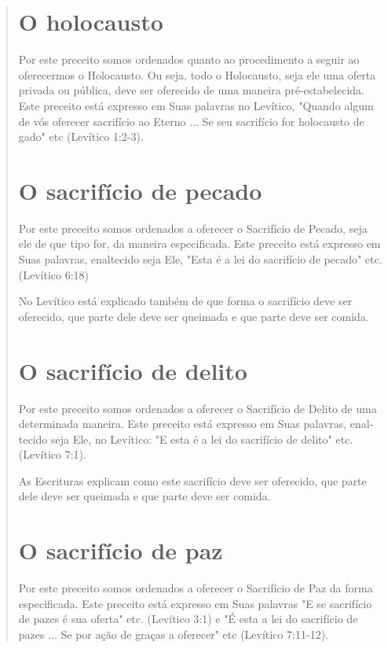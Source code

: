 \begin{quote}
\section{O holocausto}

Por este preceito somos ordenados quanto ao procedimento a se­guir ao
oferecermos o Holocausto. Ou seja, todo o Holocausto, seja ele uma
oferta privada ou pública, deve ser oferecido de uma maneira
pré-estabelecida. Este preceito está expresso em Suas palavras no
Levítico, "Quando algum de vós oferecer sacrifício ao Eterno ... Se seu
sacrifício for holocausto de gado" etc (Levítico 1:2-3).

\section{O sacrifício de pecado}

Por este preceito somos ordenados a oferecer o Sacrifício de Peca­do,
seja ele de que tipo for, da maneira especificada. Este preceito está
expres­so em Suas palavras, enaltecido seja Ele, "Esta é a lei do
sacrifício de pecado" etc. (Levítico 6:18)

No Levítico está explicado também de que forma o sacrifício deve ser
oferecido, que parte dele deve ser queimada e que parte deve ser comida.

\section{O sacrifício de delito}

Por este preceito somos ordenados a oferecer o Sacrifício de Delito de
uma determinada maneira. Este preceito está expresso em Suas palavras,
enal­tecido seja Ele, no Levítico: "E esta é a lei do sacrifício de
delito" etc. (Leví­tico 7:1).

As Escrituras explicam como este sacrifício deve ser oferecido, que
parte dele deve ser queimada e que parte deve ser comida.

\section{O sacrifício de paz}

Por este preceito somos ordenados a oferecer o Sacrifício de Paz da
forma especificada. Este preceito está expresso em Suas palavras "E se
sacrifí­cio de pazes é sua oferta" etc. (Levítico 3:1) e "É esta a lei
do sacrifício de pazes ... Se por ação de graças a oferecer" etc
(Levítico 7:11-12).


\end{quote}
